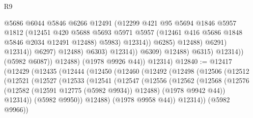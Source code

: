 \begin{lexlean}{R9}
\begin{coremodule}
                                            @5686
                                            @6044
                                            @5846
                                            @6266
                                            @12491
                                            (@12299
                                              @421
                                              @95
                                              @5694
                                              @1846
                                              @5957
                                              @1812
                                              (@12451
                                                @420
                                                @5688
                                                @5693
                                                @5971
                                                @5957
                                                (@12461 @416 @5686 @1848 @5846 @2034 @12491 @12488)
                                                @5983)
                                              @12314))
                                          @6285)
                                        @12488)
                                      @6291)
                                    @12314))
                                @6297)
                              @12488)
                            @6303)
                          @12314))
                      @6309)
                    @12488)
                  @6315)
                @12314))
            (@5982 @6087))
          @12488)
        (@1978 @9926 @44))
      @12314)
@12840 := @12417
    (@12429
      (@12435
        (@12444
          (@12450
            (@12460
              (@12492
                (@12498
                  (@12506
                    (@12512
                      (@12521
                        (@12527
                          (@12533
                            (@12541
                              (@12547
                                (@12556
                                  (@12562
                                    (@12568
                                      (@12576
                                        (@12582 (@12591 @12775 (@5982 @9934)) @12488)
                                        (@1978 @9942 @44))
                                      @12314))
                                  (@5982 @9950))
                                @12488)
                              (@1978 @9958 @44))
                            @12314))
                        (@5982 @9966))

\end{coremodule}
\end{lexlean}
